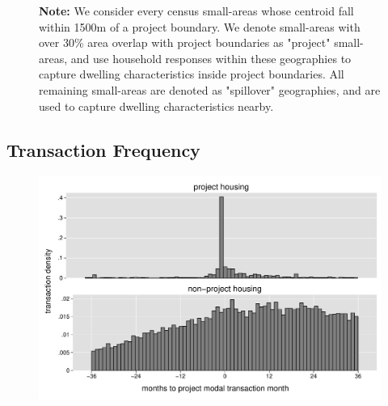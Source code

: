 \documentclass[12pt]{article}
\begin{document}
\begin{figure}[h!]
\centering
{}
\vspace{2mm}
\caption*{\footnotesize {\bf Note:} We consider every census small-areas whose centroid fall within 1500m of a project boundary. We denote small-areas with over 30\% area overlap with project boundaries as "project" small-areas, and use household responses within these geographies to capture dwelling characteristics inside project boundaries. All remaining small-areas are denoted as "spillover" geographies, and are used to capture dwelling characteristics nearby.}
\end{figure}

\pagebreak
\subsection{Transaction Frequency}
\label{appendix:histfreq}
\vspace{-5mm}
\begin{figure}[h!]
\centering
\includegraphics[scale=.4 , trim={.2cm 0.2cm .2cm 0.2cm},clip]{figures/summary_densitytime.pdf}
\end{figure}
\end{document}
